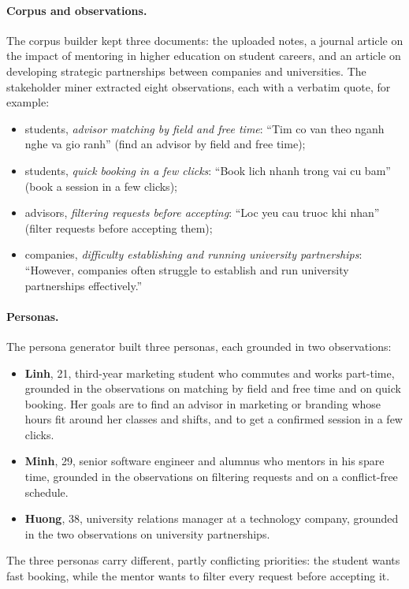 \paragraph{Corpus and observations.} The corpus builder kept three documents: the uploaded notes, a journal article on the impact of mentoring in higher education on student careers, and an article on developing strategic partnerships between companies and universities. The stakeholder miner extracted eight observations, each with a verbatim quote, for example:
\begin{itemize}
    \item students, \emph{advisor matching by field and free time}: ``Tim co van theo nganh nghe va gio ranh'' (find an advisor by field and free time);
    \item students, \emph{quick booking in a few clicks}: ``Book lich nhanh trong vai cu bam'' (book a session in a few clicks);
    \item advisors, \emph{filtering requests before accepting}: ``Loc yeu cau truoc khi nhan'' (filter requests before accepting them);
    \item companies, \emph{difficulty establishing and running university partnerships}: ``However, companies often struggle to establish and run university partnerships effectively.''
\end{itemize}

\paragraph{Personas.} The persona generator built three personas, each grounded in two observations:
\begin{itemize}
    \item \textbf{Linh}, 21, third-year marketing student who commutes and works part-time, grounded in the observations on matching by field and free time and on quick booking. Her goals are to find an advisor in marketing or branding whose hours fit around her classes and shifts, and to get a confirmed session in a few clicks.
    \item \textbf{Minh}, 29, senior software engineer and alumnus who mentors in his spare time, grounded in the observations on filtering requests and on a conflict-free schedule.
    \item \textbf{Huong}, 38, university relations manager at a technology company, grounded in the two observations on university partnerships.
\end{itemize}
The three personas carry different, partly conflicting priorities: the student wants fast booking, while the mentor wants to filter every request before accepting it.

